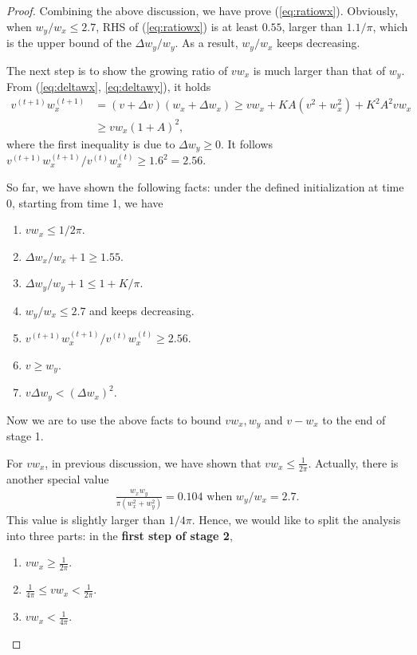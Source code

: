 \documentclass{article}
\theoremstyle{plain}
\theoremstyle{remark}
\def\t{^{(t)}}
\def\tt{^{(t+1)}}
\begin{document}
\begin{proof}
Combining the above discussion, we have prove (\ref{eq:ratiowx}). Obviously, when $w_y/w_x\le 2.7$, RHS of (\ref{eq:ratiowx}) is at least $0.55$, larger than $1.1/\pi$, which is the upper bound of the $\Delta w_y/w_y$. As a result, $w_y/w_x$ keeps decreasing.

The next step is to show the growing ratio of $v w_x$ is much larger than that of $w_y$. From (\ref{eq:deltawx}, \ref{eq:deltawy}), it holds
\begin{align*}
    v\tt w_x\tt &= (v+\Delta v)(w_x+\Delta w_x) \ge v w_x + KA(v^2+ w_x^2) + K^2 A^2 v w_x \\
    &\ge vw_x(1+A)^2,
\end{align*}
where the first inequality is due to $\Delta w_y\ge0$. It follows $v\tt w_x\tt/v\t w_x\t\ge 1.6^2=2.56$.

So far, we have shown the following facts: under the defined initialization at time 0, starting from time 1, we have
\begin{enumerate}
    \item $v w_x\le 1/2\pi$.
    \item $\Delta w_x/w_x+1\ge 1.55$.
    \item $\Delta w_y/w_y+1\le 1+K/\pi$.
    \item $w_y/w_x \le 2.7$ and keeps decreasing.
    \item $v\tt w_x\tt/v\t w_x\t\ge 2.56$.
    \item $v\ge w_y$.
    \item $v\Delta w_y<(\Delta w_x)^2$.
\end{enumerate}

Now we are to use the above facts to bound $v w_x, w_y$ and $v-w_x$ to the end of stage 1.

For $v w_x$, in previous discussion, we have shown that $v w_x\le \frac{1}{2\pi}$. Actually, there is another special value
\begin{align}
    \frac{w_x w_y}{\pi(w_x^2+w_y^2)} = 0.104 \text{  when $w_y/w_x=2.7.$}
\end{align}
This value is slightly larger than $1/4\pi$. Hence, we would like to split the analysis into three parts: in the \textbf{first step of stage 2}, 
\begin{enumerate}
    \item $v w_x\ge \frac{1}{2\pi}$.
    \item $\frac{1}{4\pi}\le v w_x<\frac{1}{2\pi}$.
    \item $v w_x<\frac{1}{4\pi}$.
\end{enumerate}


\end{proof}
\end{document}
